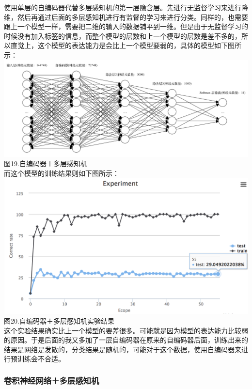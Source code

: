使用单层的自编码器代替多层感知机的第一层隐含层。先进行无监督学习来进行降维，然后再通过后面的多层感知机进行有监督的学习来进行分类。同样的，也需要跟上一个模型一样，需要把二维的输入的数据铺平到一维。但是由于无监督学习的时候没有加入标签的信息，而整个模型的层数和上一个模型的层数是差不多的，所以直觉上，这个模型的表达能力是会比上一个模型要弱的，具体的模型如下图所示：\\\includegraphics{picture/dac-mlp.png}\\图19.自编码器＋多层感知机\\而这个模型的训练结果则如下图所示：\\\includegraphics{picture/1dac-1mlp-experiment.png}\\图20.自编码器＋多层感知机实验结果\\这个实验结果确实比上一个模型的要差很多。可能就是因为模型的表达能力比较弱的原因。于是后面的我又多加了一层自编码器在原来的自编码器后面，训练出来的结果是网络是发散的，分类结果是随机的，可能对于这个数据，使用自编码器来进行预训练会不合适。

\subsubsection{卷积神经网络＋多层感知机}\label{ux5377ux79efux795eux7ecfux7f51ux7edcux591aux5c42ux611fux77e5ux673a}

